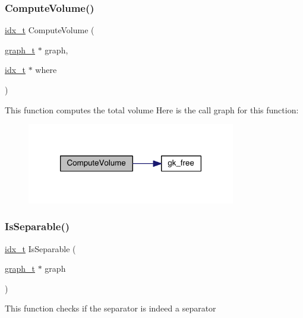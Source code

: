 \subsubsection{\texorpdfstring{Compute\+Volume()}{ComputeVolume()}}
{\footnotesize\ttfamily \hyperlink{a00876_aaa5262be3e700770163401acb0150f52}{idx\+\_\+t} Compute\+Volume (\begin{DoxyParamCaption}\item[{\hyperlink{a00734}{graph\+\_\+t} $\ast$}]{graph,  }\item[{\hyperlink{a00876_aaa5262be3e700770163401acb0150f52}{idx\+\_\+t} $\ast$}]{where }\end{DoxyParamCaption})}

This function computes the total volume Here is the call graph for this function\+:\nopagebreak
\begin{figure}[H]
\begin{center}
\leavevmode
\includegraphics[width=258pt]{a00882_aedd132a5a97a0887c9ce0513ad903a7d_cgraph}
\end{center}
\end{figure}
\mbox{\label{a00882_a0c608cde251a2992569a84c4dd448422}} 
\subsubsection{\texorpdfstring{Is\+Separable()}{IsSeparable()}}
{\footnotesize\ttfamily \hyperlink{a00876_aaa5262be3e700770163401acb0150f52}{idx\+\_\+t} Is\+Separable (\begin{DoxyParamCaption}\item[{\hyperlink{a00734}{graph\+\_\+t} $\ast$}]{graph }\end{DoxyParamCaption})}

This function checks if the separator is indeed a separator 